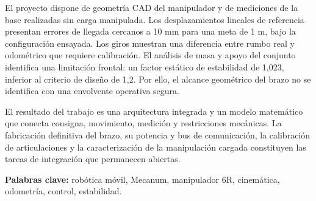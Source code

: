 \documentclass[11pt,oneside]{report}
\begin{document}
El proyecto dispone de geometría CAD del manipulador y de mediciones de la base realizadas sin carga manipulada. Los desplazamientos lineales de referencia presentan errores de llegada cercanos a 10 mm para una meta de 1 m, bajo la configuración ensayada. Los giros muestran una diferencia entre rumbo real y odométrico que requiere calibración. El análisis de masa y apoyo del conjunto identifica una limitación frontal: un factor estático de estabilidad de 1,023, inferior al criterio de diseño de 1,2. Por ello, el alcance geométrico del brazo no se identifica con una envolvente operativa segura.

El resultado del trabajo es una arquitectura integrada y un modelo matemático que conecta consigna, movimiento, medición y restricciones mecánicas. La fabricación definitiva del brazo, su potencia y bus de comunicación, la calibración de articulaciones y la caracterización de la manipulación cargada constituyen las tareas de integración que permanecen abiertas.

\textbf{Palabras clave:} robótica móvil, Mecanum, manipulador 6R, cinemática, odometría, control, estabilidad.

\tableofcontents
\clearpage
{}







\appendix

\end{document}
